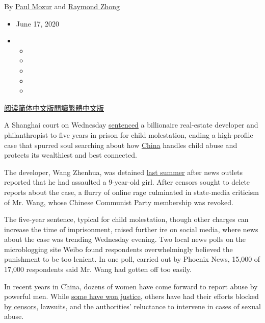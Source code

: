 By \href{https://www.nytimes.com/by/paul-mozur}{Paul Mozur} and
\href{https://www.nytimes.com/by/raymond-zhong}{Raymond Zhong}

\begin{itemize}
\item
  June 17, 2020
\item
  \begin{itemize}
  \item
  \item
  \item
  \item
  \item
  \end{itemize}
\end{itemize}

\href{https://cn.nytimes.com/china/20200618/china-wang-zhenhua-sentence/}{阅读简体中文版}\href{https://cn.nytimes.com/china/20200618/china-wang-zhenhua-sentence/z}{閱讀繁體中文版}

A Shanghai court on Wednesday
\href{https://mp.weixin.qq.com/s/aU_BA5CvK5tJMM8rPLZx_w?from=singlemessage\&isappinstalled=0\&scene=1\&clicktime=1592385659\&enterid=1592385659}{sentenced}
a billionaire real-estate developer and philanthropist to five years in
prison for child molestation, ending a high-profile case that spurred
soul searching about how
\href{https://www.nytimes.com/2020/06/17/world/asia/China-DNA-surveillance.html}{China}
handles child abuse and protects its wealthiest and best connected.

The developer, Wang Zhenhua, was detained
\href{https://www.nytimes.com/2019/07/09/business/child-sexual-abuse-wang-zhenhua-seazen.html}{last
summer} after news outlets reported that he had assaulted a 9-year-old
girl. After censors sought to delete reports about the case, a flurry of
online rage culminated in state-media criticism of Mr. Wang, whose
Chinese Communist Party membership was revoked.

The five-year sentence, typical for child molestation, though other
charges can increase the time of imprisonment, raised further ire on
social media, where news about the case was trending Wednesday evening.
Two local news polls on the microblogging site Weibo found respondents
overwhelmingly believed the punishment to be too lenient. In one poll,
carried out by Phoenix News, 15,000 of 17,000 respondents said Mr. Wang
had gotten off too easily.

In recent years in China, dozens of women have come forward to report
abuse by powerful men. While
\href{https://www.nytimes.com/2018/07/26/world/asia/china-metoo.html}{some
have won justice}, others have had their efforts blocked
\href{https://www.nytimes.com/2018/01/23/world/asia/china-women-me-too-censorship.html}{by
censors}, lawsuits, and the authorities' reluctance to intervene in
cases of sexual abuse.

